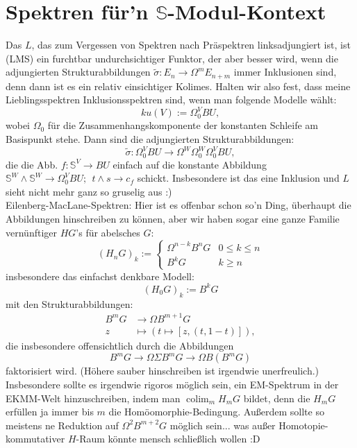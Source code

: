 \documentclass[11pt,twoside,a4paper]{scrbook} %
\DeclareMathOperator{\colim}{colim}
\begin{document}
\section{Spektren f\"ur'n $\mathbb{S}$-Modul-Kontext}
Das $L$, das zum Vergessen von Spektren nach Pr\"aspektren linksadjungiert ist, ist (LMS) ein furchtbar undurchsichtiger Funktor, der aber besser wird,
wenn die adjungierten Strukturabbildungen $\tilde{\sigma}\colon E_n\rightarrow \Omega^mE_{n+m}$ immer Inklusionen sind, denn dann ist es ein relativ einsichtiger
Kolimes. Halten wir also fest, dass meine Lieblingsspektren Inklusionsspektren sind, wenn man folgende Modelle w\"ahlt:\\
$$ku(V):=\Omega^V_0BU,$$
wobei $\Omega_0$ f\"ur die Zusammenhangskomponente der konstanten Schleife am Basispunkt stehe. Dann sind die adjungierten Strukturabbildungen:
$$\tilde{\sigma}\colon \Omega^V_0BU \rightarrow \Omega^W\Omega^W_0\Omega^V_0BU,$$
die die Abb. $f\colon \mathbb{S}^V\rightarrow BU$ einfach auf die konstante Abbildung $\mathbb{S}^W\wedge\mathbb{S}^W \rightarrow \Omega^V_0BU; ~~t\wedge s \rightarrow c_f$ schickt.
Insbesondere ist das eine Inklusion und $L$ sieht nicht mehr ganz so gruselig aus :)\\
Eilenberg-MacLane-Spektren: Hier ist es offenbar schon so'n Ding, \"uberhaupt die Abbildungen hinschreiben zu k\"onnen, aber wir haben sogar eine ganze Familie vern\"unftiger $HG$'s f\"ur abelsches $G$:
$$(H_nG)_k:=\begin{cases}\Omega^{n-k}B^nG & 0\leq k\leq n \\ B^kG & k\geq n\end{cases}$$
insbesondere das einfachst denkbare Modell:
$$(H_0G)_k:=B^kG$$
mit den Strukturabbildungen:
$$\begin{aligned}B^mG&\rightarrow \Omega B^{m+1}G\\z&\mapsto (t\mapsto [z,(t,1-t)]),\end{aligned}$$
die insbesondere offensichtlich durch die Abbildungen $$B^mG\rightarrow \Omega\Sigma B^m G \rightarrow \Omega B(B^m G)$$ faktorisiert wird. (H\"ohere sauber hinschreiben ist irgendwie unerfreulich.)
Insbesondere sollte es irgendwie rigoros m\"oglich sein, ein EM-Spektrum in der EKMM-Welt hinzuschreiben, indem man $\colim_m H_mG$ bildet, denn die $H_mG$ erf\"ullen ja immer bis $m$ die
Hom\"oomorphie-Bedingung. Au\ss erdem sollte so meistens ne Reduktion auf $\Omega^2B^{m+2}G$ m\"oglich sein... was au\ss er Homotopie-kommutativer $H$-Raum k\"onnte mensch schlie\ss lich wollen :D
\end{document}
